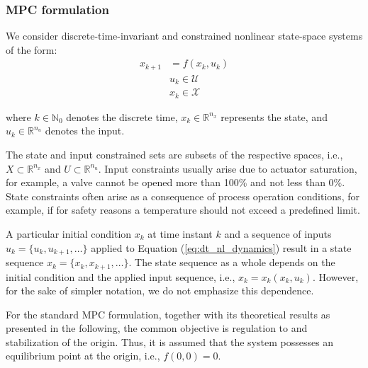 \subsubsection{MPC formulation} \label{sec:Section 3.2}
We consider discrete-time-invariant and constrained nonlinear state-space systems of the form:
\begin{equation}\label{eq:dt_nl_dynamics}
\begin{aligned}
 x_{k+1} & = f(x_k,u_k) \\
 & u_k \in \mathcal{U} \\
& x_k \in \mathcal{X}
\end{aligned}
\end{equation}

where \( k \in \mathbb{N}_0 \) denotes the discrete time, \( x_k \in \mathbb{R}^{n_x} \) represents the state, and \( u_k \in \mathbb{R}^{n_u} \) denotes the input. 

The state and input constrained sets are subsets of the respective spaces, i.e., \( X \subset \mathbb{R}^{n_x} \) and \( U \subset \mathbb{R}^{n_u} \). Input constraints usually arise due to actuator saturation, for example, a valve cannot be opened more than 100\% and not less than 0\%. State constraints often arise as a consequence of process operation conditions, for example, if for safety reasons a temperature should not exceed a predefined limit.

A particular initial condition \( x_k \) at time instant \( k \) and a sequence of inputs \( u_k = \{u_k,u_{k+1},\ldots\} \) applied to Equation (\ref{eq:dt_nl_dynamics}) result in a state sequence \( x_k = \{x_k,x_{k+1},\ldots\} \). The state sequence as a whole depends on the initial condition and the applied input sequence, i.e., \( x_k = x_k(x_k,u_k) \). However, for the sake of simpler notation, we do not emphasize this dependence.

For the standard MPC formulation, together with its theoretical results as presented in the following, the common objective is regulation to and stabilization of the origin. Thus, it is assumed that the system possesses an equilibrium point at the origin, i.e., \( f(0,0) = 0 \).

